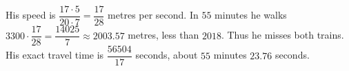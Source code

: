 His speed is $\dfrac{17\cdot5}{20\cdot7}=\dfrac{17}{28}$ metres per second. In $55$ minutes he walks $3300\cdot\dfrac{17}{28}=\dfrac{14025}{7}\approx2003.57$ metres, less than $2018$. Thus he misses both trains. His exact travel time is $\dfrac{56504}{17}$ seconds, about $55$ minutes $23.76$ seconds.
